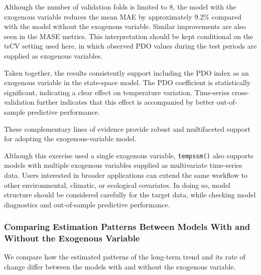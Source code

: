 \documentclass[
]{article}
\begin{document}
Although the number of validation folds is limited to 8, the model with
the exogenous variable reduces the mean MAE by approximately 9.2\%
compared with the model without the exogenous variable. Similar
improvements are also seen in the MASE metrics. This interpretation
should be kept conditional on the tsCV setting used here, in which
observed PDO values during the test periods are supplied as exogenous
variables.

Taken together, the results consistently support including the PDO index
as an exogenous variable in the state-space model. The PDO coefficient
is statistically significant, indicating a clear effect on temperature
variation. Time-series cross-validation further indicates that this
effect is accompanied by better out-of-sample predictive performance.

These complementary lines of evidence provide robust and multifaceted
support for adopting the exogenous-variable model.

Although this exercise used a single exogenous variable,
\texttt{tempssm()} also supports models with multiple exogenous
variables supplied as multivariate time-series data. Users interested in
broader applications can extend the same workflow to other
environmental, climatic, or ecological covariates. In doing so, model
structure should be considered carefully for the target data, while
checking model diagnostics and out-of-sample predictive performance.

\subsubsection{Comparing Estimation Patterns Between Models With and
Without the Exogenous
Variable}\label{comparing-estimation-patterns-between-models-with-and-without-the-exogenous-variable}

We compare how the estimated patterns of the long-term trend and its
rate of change differ between the models with and without the exogenous
variable.
\end{document}
